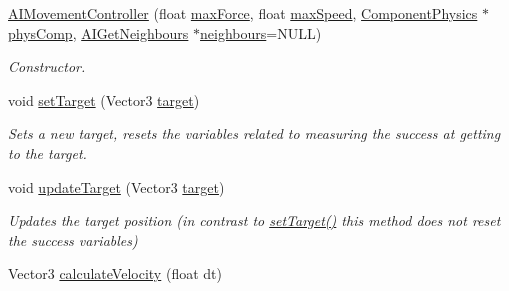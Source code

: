 \begin{DoxyCompactItemize}
\item 
\hypertarget{classAIMovementController_afd3a3e59fa1c03cf0be592998fd7b8af}{
\hyperlink{classAIMovementController_afd3a3e59fa1c03cf0be592998fd7b8af}{\-A\-I\-Movement\-Controller} (float \hyperlink{classAIMovementController_add1da64ae7c6fab79fb418b15c7fe72b}{max\-Force}, float \hyperlink{classAIMovementController_a9d69a734a62aa7fdad70dba727970a6d}{max\-Speed}, \hyperlink{classComponentPhysics}{\-Component\-Physics} $\ast$\hyperlink{classAIMovementController_a8f940ad2033bac1311b1a2f22f52fb7a}{phys\-Comp}, \hyperlink{classAIGetNeighbours}{\-A\-I\-Get\-Neighbours} $\ast$\hyperlink{classAIMovementController_addc735dc467b412a98c0d15fd4581b7c}{neighbours}=\-N\-U\-L\-L)}
\label{d2/d30/classAIMovementController_afd3a3e59fa1c03cf0be592998fd7b8af}

\begin{DoxyCompactList}\small\item\em \-Constructor. \end{DoxyCompactList}\item 
\hypertarget{classAIMovementController_a3772cc302fa2746267094e7e09854a49}{
void \hyperlink{classAIMovementController_a3772cc302fa2746267094e7e09854a49}{set\-Target} (\-Vector3 \hyperlink{classAIMovementController_a2cb43e63ec6273c18ba6bb527ee57324}{target})}
\label{d2/d30/classAIMovementController_a3772cc302fa2746267094e7e09854a49}

\begin{DoxyCompactList}\small\item\em \-Sets a new target, resets the variables related to measuring the success at getting to the target. \end{DoxyCompactList}\item 
\hypertarget{classAIMovementController_aac3b848eac34e04b809415cf5f5de7ae}{
void \hyperlink{classAIMovementController_aac3b848eac34e04b809415cf5f5de7ae}{update\-Target} (\-Vector3 \hyperlink{classAIMovementController_a2cb43e63ec6273c18ba6bb527ee57324}{target})}
\label{d2/d30/classAIMovementController_aac3b848eac34e04b809415cf5f5de7ae}

\begin{DoxyCompactList}\small\item\em \-Updates the target position (in contrast to \hyperlink{classAIMovementController_a3772cc302fa2746267094e7e09854a49}{set\-Target()} this method does not reset the success variables) \end{DoxyCompactList}\item 
\hypertarget{classAIMovementController_a36c14ef1408430dfa365598a1f82285f}{
\-Vector3 \hyperlink{classAIMovementController_a36c14ef1408430dfa365598a1f82285f}{calculate\-Velocity} (float dt)}
\label{d2/d30/classAIMovementController_a36c14ef1408430dfa365598a1f82285f}


\end{DoxyCompactItemize}
